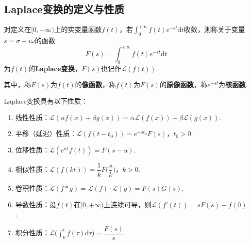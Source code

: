 \documentclass[openany,oneside]{ctexbook}
\begin{document}
\subsection{Laplace变换的定义与性质}

\begin{definition}
    对定义在$[0,+\infty)$上的实变量函数$f(t)$，若$\displaystyle\int_0^{+\infty}f(t)e^{-st}\mathrm{d}t$收敛，则称关于变量$s=\sigma+i\omega$的函数
    \begin{equation}
        F(s)=\int_0^{+\infty}f(t)e^{-st}\mathrm{d}t
    \end{equation}
    为$f(t)$的\textbf{Laplace变换}，$F(s)$也记作$\mathcal{L}(f(t))$.
\end{definition}
其中，称$F(s)$为$f(t)$的\textbf{像函数}，称$f(t)$为$F(s)$的\textbf{原像函数}，称$e^{-st}$为\textbf{核函数}.
\par Laplace变换具有以下性质：
\begin{enumerate}[label=(\arabic*), itemsep=1pt]
    \item 线性性质：$\mathcal{L}(\alpha f(x)+\beta g(x))=\alpha\mathcal{L}(f(x))+\beta\mathcal{L}(g(x))$.
    \item 平移（延迟）性质：$\mathcal{L}(f(t-t_0))=e^{-st_0}F(s)$，$t_0>0$.
    \item 位移性质：$\mathcal{L}(e^{\alpha t}f(t))=F(s-\alpha)$.
    \item 相似性质：$\mathcal{L}(f(kt))=\dfrac{1}{k}F\biggl(\dfrac{s}{k}\biggr)$，$k>0$.
    \item 卷积性质：$\mathcal{L}(f*g)=\mathcal{L}(f)\cdot\mathcal{L}(g)=F(s)G(s)$.
    \item 导数性质：设$f(t)$在$[0,+\infty)$上连续可导，则$\mathcal{L}(f'(t))=sF(s)-f(0)$.
    \item 积分性质：$\mathcal{L}\biggl(\displaystyle\int_{0}^{t}f(\tau)\mathrm{d}\tau\biggr)=\dfrac{F(s)}{s}.$
\end{enumerate}
\end{document}
